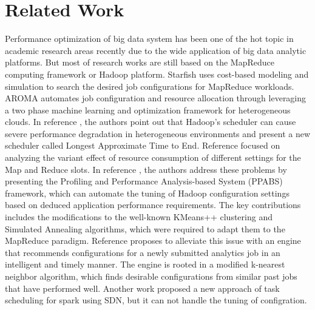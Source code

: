 \section{Related Work}\label{sec:related}
\par Performance optimization of big data system has been one of the hot topic in academic research areas recently due to the wide application of big data analytic platforms. But most of research works are still based on the MapReduce computing framework or Hadoop platform. Starfish \cite{starfish} uses cost-based modeling and simulation to search the desired job configurations for MapReduce workloads. AROMA \cite{AROMA} automates job configuration and resource allocation through leveraging a two phase machine learning and optimization framework for heterogeneous clouds. In reference \cite{zaharia2008Improving}, the authors point out that Hadoop's scheduler can cause severe performance degradation in heterogeneous environments and present a new scheduler called Longest Approximate Time to End. Reference \cite{kambatla2009towards} focused on analyzing the variant effect of resource consumption of different settings for the Map and Reduce slots. In reference \cite{wu2013selftuning}, the authors address these problems by presenting the Profiling and Performance Analysis-based System (PPABS) framework, which can automate the tuning of Hadoop configuration settings based on deduced application performance requirements. The key contributions includes the modifications to the well-known KMeans++ clustering and Simulated Annealing algorithms, which were required to adapt them to the MapReduce paradigm. Reference \cite{zhang2015finding} proposes to alleviate this issue with an engine that recommends configurations for a newly submitted analytics job in an intelligent and timely manner. The engine is rooted in a modified k-nearest neighbor algorithm, which finds desirable configurations from similar past jobs that have performed well. Another work \cite{firebirdHeS16} proposed a new approach of task scheduling for spark using SDN, but it can not handle the tuning of configration.

